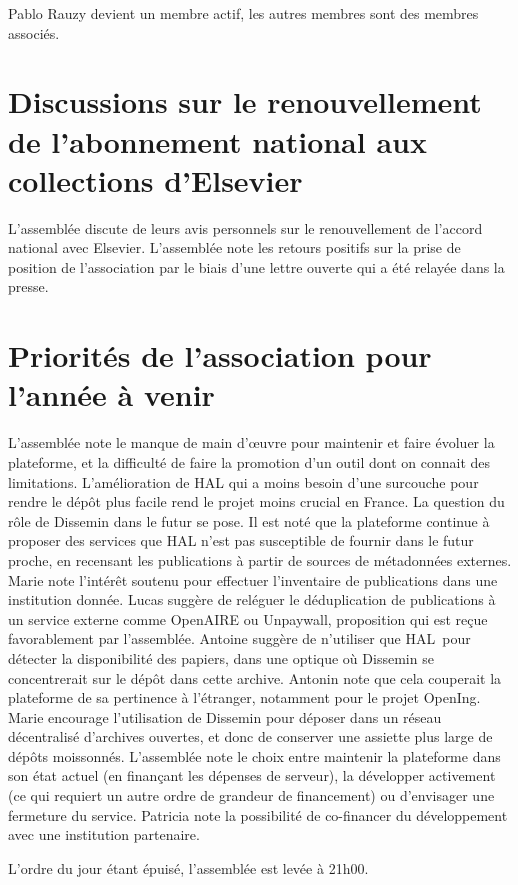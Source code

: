 \documentclass[a4paper]{article}
\begin{document}
Pablo Rauzy devient un membre actif, les autres membres sont des membres
associés.
  
\section{Discussions sur le renouvellement de l'abonnement national aux collections d'Elsevier}

L'assemblée discute de leurs avis personnels sur le renouvellement de l'accord national avec Elsevier. L'assemblée note les retours positifs sur la prise de position de l'association par le biais d'une lettre ouverte qui a été relayée dans la presse.

\section{Priorités de l'association pour l'année à venir}

L'assemblée note le manque de main d'œuvre pour maintenir et faire évoluer la plateforme,
et la difficulté de faire la promotion d'un outil dont on connait des limitations.
L'amélioration de HAL qui a moins besoin d'une surcouche pour rendre le dépôt plus facile
rend le projet moins crucial en France. La question du rôle de Dissemin dans le futur se pose. Il est noté que la plateforme continue à proposer des services que HAL n'est pas susceptible de fournir dans le futur proche, en recensant les publications à
partir de sources de métadonnées externes.
Marie note l'intérêt soutenu pour effectuer l'inventaire de publications dans une institution donnée.
Lucas suggère de reléguer le déduplication de publications à un service externe comme OpenAIRE ou Unpaywall, proposition qui est reçue favorablement par l'assemblée.
Antoine suggère de n'utiliser que HAL pour détecter la disponibilité des papiers, dans une optique où Dissemin se concentrerait sur le dépôt dans cette archive. Antonin note que cela couperait la plateforme de sa pertinence à l'étranger, notamment pour le
projet OpenIng.
Marie encourage l'utilisation de Dissemin pour déposer dans un réseau décentralisé d'archives ouvertes, et donc de conserver une assiette plus large de dépôts moissonnés.
L'assemblée note le choix entre maintenir la plateforme dans son état actuel (en finançant les dépenses de serveur), la développer activement (ce qui requiert un autre ordre de grandeur de financement) ou d'envisager une fermeture du service. Patricia note
la possibilité de co-financer du développement avec une institution partenaire.

L'ordre du jour étant épuisé, l'assemblée est levée à 21h00.
\end{document}
